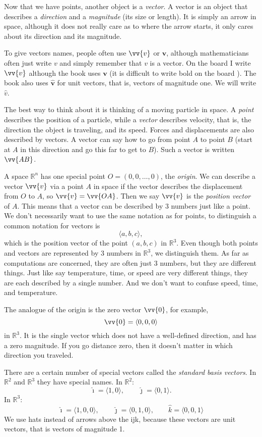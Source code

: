 \documentclass[11pt]{article}
\newcommand{\R}{{\mathbb{R}}}
\newcommand{\veci}{\hat{\imath}}
\newcommand{\vecj}{\hat{\jmath}}
\newcommand{\veck}{\hat{k}}
\begin{document}
Now that we have points, another object is a \emph{vector}.
A vector is an object that describes a \emph{direction} and a \emph{magnitude} (its size or length).
It is simply an arrow in space,
although it does not really care as to where the arrow starts,
it only cares about its direction and its magnitude.

To give vectors names, people often use
$\vv{v}$ or $\mathbf{v}$, although mathematicians often just write $v$ and simply remember
that $v$ is a vector.
On the board I write $\vv{v}$ although the book uses $\mathbf{v}$
(it is difficult to write bold on the board \Smiley{}).
The book also uses $\mathbf{\hat{v}}$ for unit vectors, that is,
vectors of magnitude one.  We will write $\hat{v}$.

The best way to think about it is thinking of a moving particle in space.
A \emph{point} describes the position of a particle,
while a \emph{vector} describes velocity, that is, the direction the object is traveling, and its speed.
Forces and displacements are also described by vectors.
A vector can say how to go from point $A$ to point $B$
(start at $A$ in this direction and go this far to get to $B$).
Such a vector is written $\vv{AB}$.

A space $\R^n$ has one special point $O = (0,0,\ldots,0)$, the \emph{origin}.
We can describe a vector $\vv{v}$ via a point $A$ in space if the vector describes the
displacement from $O$ to $A$, so $\vv{v} = \vv{OA}$.
Then we say $\vv{v}$ is the \emph{position vector} of $A$.
This means that a vector can be described by 3 numbers just like a point.
We don't necessarily want to use the same notation as for points, to distinguish
a common notation for vectors is
$$
\langle a,b,c \rangle ,
$$
which is the position vector of the point $(a,b,c)$ in $\R^3$.
Even though both points and vectors are represented by 3 numbers in $\R^3$,
we distinguish them.
As far as computations are concerned,
they are often just 3 numbers, but they are different things.
Just like say temperature, time, or speed are very different
things, they are each described by a single number.  And we don't want to
confuse speed, time, and temperature.

The analogue of the origin is the zero vector $\vv{0}$, for example,
$$
\vv{0} = \langle 0,0,0 \rangle
$$
in $\R^3$.
It is the single vector which does not have a well-defined direction,
and has a zero magnitude.
If you go distance zero, then it doesn't matter in which direction
you traveled.

There are a certain number of special vectors called the
\emph{standard basis vectors}.
In $\R^2$ and $\R^3$ they have special names.
In $\R^2$:
$$
\veci = \langle 1 , 0 \rangle, \qquad
\vecj = \langle 0 , 1 \rangle.
$$
In $\R^3$:
$$
\veci = \langle 1, 0, 0 \rangle, \qquad
\vecj = \langle 0, 1, 0 \rangle, \qquad
\veck = \langle 0, 0, 1 \rangle
$$
We use hats instead of arrows above the ijk,
because these vectors are
unit vectors, that is vectors of magnitude 1.
\end{document}
